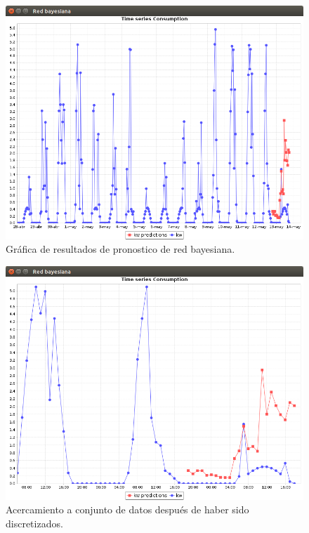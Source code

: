 \begin{figure}[!h]
	\centering
	\includegraphics[width=13.5cm]{img/redBayesianaRes.png}
	\caption{Gráfica de resultados de pronostico de red bayesiana.}
	\label{fig:redBayesianaRes}
\end{figure}

\begin{figure}[ht]
	\centering
	\includegraphics[width=13.5cm]{img/redBayesianaResZoom.png}
	\caption{Acercamiento a conjunto de datos después de haber sido discretizados.}
	\label{fig:redBayesianaResZoom}
\end{figure}


